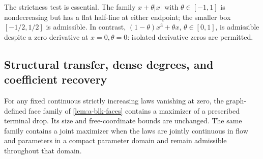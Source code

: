 The strictness test is essential. The family $x+\theta|x|$ with
$\theta\in[-1,1]$ is nondecreasing but has a flat half-line at either
endpoint; the smaller box $[-1/2,1/2]$ is admissible. In contrast,
$(1-\theta)x^3+\theta x$, $\theta\in[0,1]$, is admissible despite a zero
derivative at $x=0,\theta=0$: isolated derivative zeros are permitted.

\subsection{Structural transfer, dense degrees, and coefficient recovery}
\begin{lemma}
\label{lem:a-law-faces}
For any fixed continuous strictly increasing laws vanishing at zero,
the graph-defined face family of \cref{lem:a-blk-faces} contains a
maximizer of a prescribed terminal drop. Its size and free-coordinate
bounds are unchanged. The same family contains a joint maximizer when
the laws are jointly continuous in flow and parameters in a compact parameter domain and
remain admissible throughout that domain.
\end{lemma}
